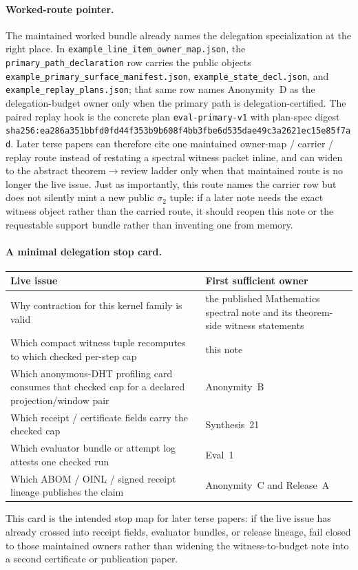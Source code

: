 \documentclass[11pt]{article}
\begin{document}
\paragraph{Worked-route pointer.}
The maintained worked bundle already names the delegation specialization at the right place. In \nolinkurl{example\_line\_item\_owner\_map.json}, the \texttt{primary\_path\_declaration} row carries the public objects \nolinkurl{example\_primary\_surface\_manifest.json}, \nolinkurl{example\_state\_decl.json}, and \nolinkurl{example\_replay\_plans.json}; that same row names Anonymity~D as the delegation-budget owner only when the primary path is delegation-certified. The paired replay hook is the concrete plan \texttt{eval-primary-v1} with plan-spec digest \texttt{sha256:ea286a351bbfd0fd44f353b9b608f4bb3fbe6d535dae49c3a2621ec15e85f7ad}. Later terse papers can therefore cite one maintained owner-map / carrier / replay route instead of restating a spectral witness packet inline, and can widen to the abstract theorem$\to$review ladder only when that maintained route is no longer the live issue. Just as importantly, this route names the carrier row but does not silently mint a new public $\sigma_2$ tuple: if a later note needs the exact witness object rather than the carried route, it should reopen this note or the requestable support bundle rather than inventing one from memory.\cite{series:workedexample,series:seriesspines}

\paragraph{A minimal delegation stop card.}
\begin{center}\small
\begin{tabular}{@{}p{3.4cm}p{8.0cm}@{}}
\toprule
\textbf{Live issue} & \textbf{First sufficient owner}\\
\midrule
Why contraction for this kernel family is valid & the published Mathematics spectral note and its theorem-side witness statements\\
Which compact witness tuple recomputes to which checked per-step cap & this note\\
Which anonymous-DHT profiling card consumes that checked cap for a declared projection/window pair & Anonymity~B\\
Which receipt / certificate fields carry the checked cap & Synthesis~21\\
Which evaluator bundle or attempt log attests one checked run & Eval~1\\
Which ABOM / OINL / signed receipt lineage publishes the claim & Anonymity~C and Release~A\\
\bottomrule
\end{tabular}
\end{center}
This card is the intended stop map for later terse papers: if the live issue has already crossed into receipt fields, evaluator bundles, or release lineage, fail closed to those maintained owners rather than widening the witness-to-budget note into a second certificate or publication paper.
\end{document}

